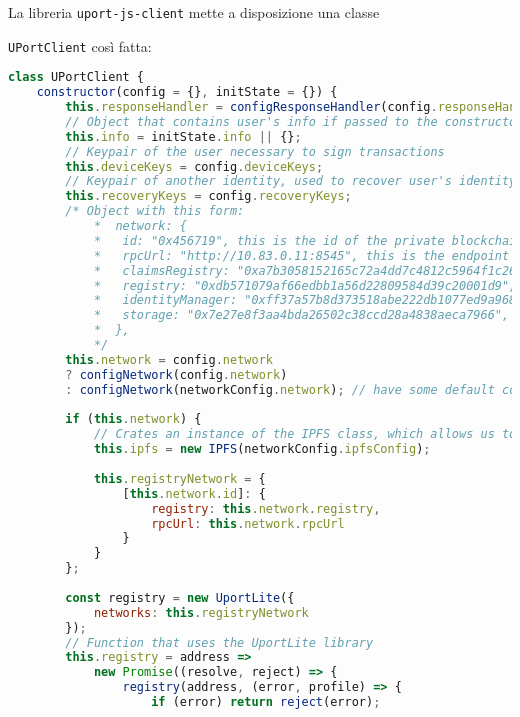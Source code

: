 La libreria \texttt{uport-js-client} mette a disposizione una classe

\texttt{UPortClient} così fatta:

\begin{lstlisting}[language=JavaScript, numbers=none]
class UPortClient {
    constructor(config = {}, initState = {}) {
        this.responseHandler = configResponseHandler(config.responseHandler);
        // Object that contains user's info if passed to the constructor, else empty object
        this.info = initState.info || {};
        // Keypair of the user necessary to sign transactions
        this.deviceKeys = config.deviceKeys;
        // Keypair of another identity, used to recover user's identity (Not used in BLINC as for now Identities are saved on a DB)
        this.recoveryKeys = config.recoveryKeys;
        /* Object with this form:
            *  network: {
            *   id: "0x456719", this is the id of the private blockchain deployed for BLINC
            *   rpcUrl: "http://10.83.0.11:8545", this is the endpoint we connect to in order to communicate with the blockchain via EthJS, a JavaScript library
            *   claimsRegistry: "0xa7b3058152165c72a4dd7c4812c5964f1c26f00d", this is the address of the EthereumClaimsRegistry contract on BLINC's private chain
            *   registry: "0xdb571079af66edbb1a56d22809584d39c20001d9", this is the address of the UportRegistry contract on BLINC's private chain
            *   identityManager: "0xff37a57b8d373518abe222db1077ed9a968a5fdf", this is the address of the IdentityManager contract on BLINC's private chain
            *   storage: "0x7e27e8f3aa4bda26502c38ccd28a4838aeca7966", this is the address of the smart contract that stores the IPFS hashes of user's documents
            *  },
            */
        this.network = config.network
        ? configNetwork(config.network)
        : configNetwork(networkConfig.network); // have some default connect/setup testrpc
    
        if (this.network) {
            // Crates an instance of the IPFS class, which allows us to communicate with the IPFS node specified in the configuration
            this.ipfs = new IPFS(networkConfig.ipfsConfig);
        
            this.registryNetwork = {
                [this.network.id]: {
                    registry: this.network.registry,
                    rpcUrl: this.network.rpcUrl
                }
            }
        };
    
        const registry = new UportLite({
            networks: this.registryNetwork
        });
        // Function that uses the UportLite library
        this.registry = address =>
            new Promise((resolve, reject) => {
                registry(address, (error, profile) => {
                    if (error) return reject(error);
        

\end{lstlisting}
